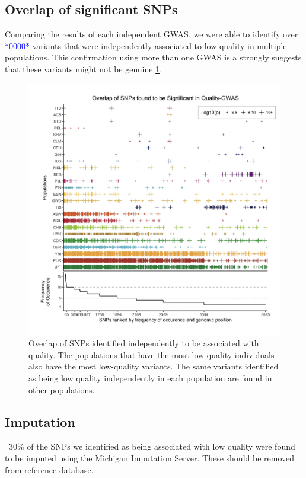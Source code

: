 \documentclass[9pt,lineno]{elife}
\newcommand{\todo}[1]{\textcolor{blue}{*#1*}}
\begin{document}
	\subsection{Overlap of significant SNPs}
Comparing the results of each independent GWAS, we were able to identify over \todo{0000} variants that were independently associated to low quality in multiple populations. This confirmation using more than one GWAS is a strongly suggests that these variants might not be genuine \ref{Figure3}. 

\begin{figure}
\includegraphics[width=\hsize,keepaspectratio]{SNPOverlap6.jpg}

\caption{Overlap of SNPs identified independently to be associated with quality. 
The populations that have the most low-quality individuals also have the most low-quality variants. 
The same variants identified as being low quality independently in each population are found in other populations. }
  \label{Figure3}
\end{figure}

	\subsection{Imputation}
~30\% of the SNPs we identified as being associated with low quality were found to be imputed using the Michigan Imputation Server. These should be removed from reference database.
\end{document}
